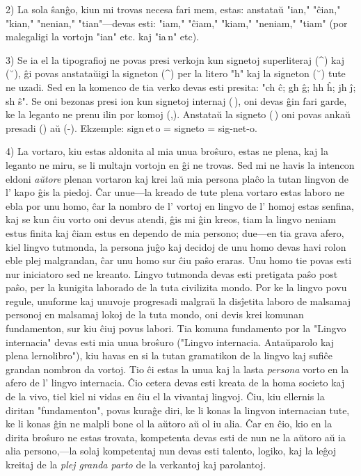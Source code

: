\documentclass[12pt,twoside]{book}
\begin{document}
2) La sola ŝanĝo, kiun mi trovas necesa fari mem, estas: anstataŭ "ian," "ĉian," "kian," "nenian," "tian"—devas esti: "iam," "ĉiam," "kiam," "neniam," "tiam" (por malegaligi la vortojn "ian" etc. kaj "ia\,n" etc).

3) Se ia el la tipografioj ne povas presi verkojn kun signetoj superliteraj (\^{}) kaj (˘), ĝi povas anstataŭigi la signeton (\^{}) per la litero "h" kaj la signeton (˘) tute ne uzadi. Sed en la komenco de tia verko devas esti presita: "ch \eg ĉ; gh \eg ĝ; hh \eg ĥ; jh \eg ĵ; sh \eg ŝ". Se oni bezonas presi ion kun signetoj internaj (\,), oni devas ĝin fari garde, ke la leganto ne prenu ilin por komoj (,). Anstataŭ la signeto (\,) oni povas ankaŭ presadi ({}) aŭ (-). Ekzemple: sign\,et\,o = sign{}et{}o = sig-net-o.

4) La vortaro, kiu estas aldonita al mia unua broŝuro, estas ne plena, kaj la leganto ne miru, se li multajn vortojn en ĝi ne trovas. Sed mi ne havis la intencon eldoni \emph{aŭtore} plenan vortaron kaj krei laŭ mia persona plaĉo la tutan lingvon de l' kapo ĝis la piedoj. Ĉar unue—la kreado de tute plena vortaro estas laboro ne ebla por unu homo, ĉar la nombro de l' vortoj en lingvo de l' homoj estas senfina, kaj se kun ĉiu vorto oni devus atendi, ĝis mi ĝin kreos, tiam la lingvo neniam estus finita kaj ĉiam estus en dependo de mia persono; due—en tia grava afero, kiel lingvo tutmonda, la persona juĝo kaj decidoj de unu homo devas havi rolon eble plej malgrandan, ĉar unu homo sur ĉiu paŝo eraras. Unu homo tie povas esti nur iniciatoro sed ne kreanto. Lingvo tutmonda devas esti pretigata paŝo post paŝo, per la kunigita laborado de la tuta civilizita mondo. Por ke la lingvo povu regule, unuforme kaj unuvoje progresadi malgraŭ la disĵetita laboro de malsamaj personoj en malsamaj lokoj de la tuta mondo, oni devis krei komunan fundamenton, sur kiu ĉiuj povus labori. Tia komuna fundamento por la "Lingvo internacia" devas esti mia unua broŝuro ("Lingvo internacia. Antaŭparolo kaj plena lernolibro"), kiu havas en si la tutan gramatikon de la lingvo kaj sufiĉe grandan nombron da vortoj. Tio ĉi estas la unua kaj la lasta \emph{persona} vorto en la afero de l' lingvo internacia. Ĉio cetera devas esti kreata de la homa societo kaj de la vivo, tiel kiel ni vidas en ĉiu el la vivantaj lingvoj. Ĉiu, kiu ellernis la diritan "fundamenton", povas kuraĝe diri, ke li konas la lingvon internacian tute, ke li konas ĝin ne malpli bone ol la aŭtoro aŭ ol iu alia. Ĉar en ĉio, kio en la dirita broŝuro ne estas trovata, kompetenta devas esti de nun ne la aŭtoro aŭ ia alia persono,—la solaj kompetentaj nun devas esti talento, logiko, kaj la leĝoj kreitaj de la \emph{plej granda parto} de la verkantoj kaj parolantoj.
\end{document}
